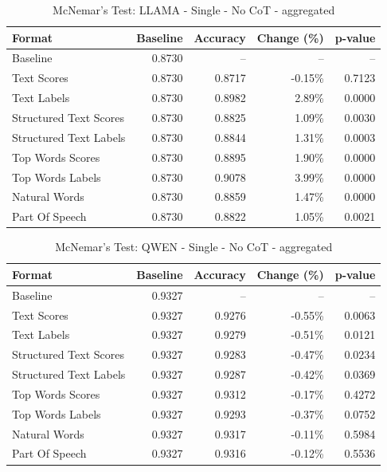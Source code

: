 \begin{table}[htbp]
\centering
\caption{McNemar's Test: LLAMA - Single - No CoT - aggregated}
\label{tab:llama-single-no_chain_of_thought-aggregated}
\begin{tabular}{lrrrr}
\toprule
Format & Baseline & Accuracy & Change (\%) & p-value \\
\midrule
Baseline & 0.8730 & -- & -- & -- \\
Text Scores & 0.8730 & 0.8717 & -0.15\% & 0.7123 \\
Text Labels & 0.8730 & 0.8982 & 2.89\% & 0.0000 \\
Structured Text Scores & 0.8730 & 0.8825 & 1.09\% & 0.0030 \\
Structured Text Labels & 0.8730 & 0.8844 & 1.31\% & 0.0003 \\
Top Words Scores & 0.8730 & 0.8895 & 1.90\% & 0.0000 \\
Top Words Labels & 0.8730 & 0.9078 & 3.99\% & 0.0000 \\
Natural Words & 0.8730 & 0.8859 & 1.47\% & 0.0000 \\
Part Of Speech & 0.8730 & 0.8822 & 1.05\% & 0.0021 \\
\bottomrule
\end{tabular}
\end{table}

\begin{table}[htbp]
\centering
\caption{McNemar's Test: QWEN - Single - No CoT - aggregated}
\label{tab:qwen-single-no_chain_of_thought-aggregated}
\begin{tabular}{lrrrr}
\toprule
Format & Baseline & Accuracy & Change (\%) & p-value \\
\midrule
Baseline & 0.9327 & -- & -- & -- \\
Text Scores & 0.9327 & 0.9276 & -0.55\% & 0.0063 \\
Text Labels & 0.9327 & 0.9279 & -0.51\% & 0.0121 \\
Structured Text Scores & 0.9327 & 0.9283 & -0.47\% & 0.0234 \\
Structured Text Labels & 0.9327 & 0.9287 & -0.42\% & 0.0369 \\
Top Words Scores & 0.9327 & 0.9312 & -0.17\% & 0.4272 \\
Top Words Labels & 0.9327 & 0.9293 & -0.37\% & 0.0752 \\
Natural Words & 0.9327 & 0.9317 & -0.11\% & 0.5984 \\
Part Of Speech & 0.9327 & 0.9316 & -0.12\% & 0.5536 \\
\bottomrule
\end{tabular}
\end{table}

